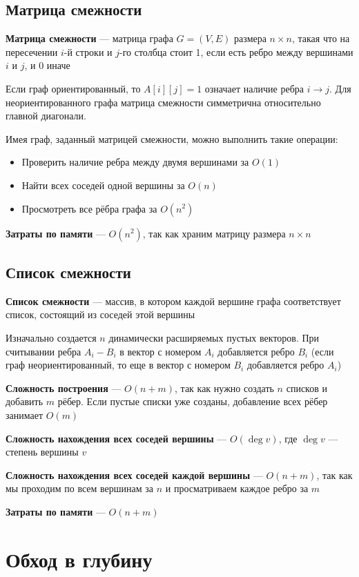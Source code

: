 \documentclass[a4paper]{article}
\begin{document}
\subsection{Матрица смежности}
\textbf{Матрица смежности} — матрица графа $G=(V,E)$ размера $n\times n$, такая что на пересечении $i$-й строки и $j$-го столбца стоит 1, если есть ребро между вершинами $i$ и $j$, и 0 иначе

Если граф ориентированный, то $A[i][j]=1$ означает наличие ребра $i\to j$. Для неориентированного графа матрица смежности симметрична относительно главной диагонали.

Имея граф, заданный матрицей смежности, можно выполнить такие операции:
\begin{itemize}
    \item Проверить наличие ребра между двумя вершинами за $O(1)$
    \item Найти всех соседей одной вершины за $O(n)$
    \item Просмотреть все рёбра графа за $O(n^2)$
\end{itemize}

\textbf{Затраты по памяти} — $O(n^2)$, так как храним матрицу размера $n\times n$

\subsection{Список смежности}
\textbf{Список смежности} — массив, в котором каждой вершине графа соответствует список, состоящий из соседей этой вершины

Изначально создается $n$ динамически расширяемых пустых векторов. При считывании ребра $A_i-B_i$ в вектор с номером $A_i$ добавляется ребро $B_i$ (если граф неориентированный, то еще в вектор с номером $B_i$ добавляется ребро $A_i$)

\textbf{Сложность построения} — $O(n+m)$, так как нужно создать $n$ списков и добавить $m$ рёбер. Если пустые списки уже созданы, добавление всех рёбер занимает $O(m)$

\textbf{Сложность нахождения всех соседей вершины} — $O(\deg v)$, где $\deg v$ — степень вершины $v$

\textbf{Сложность нахождения всех соседей каждой вершины} — $O(n+m)$, так как мы проходим по всем вершинам за $n$ и просматриваем каждое ребро за $m$

\textbf{Затраты по памяти} — $O(n+m)$

\newpage
\section{Обход в глубину}
\end{document}
